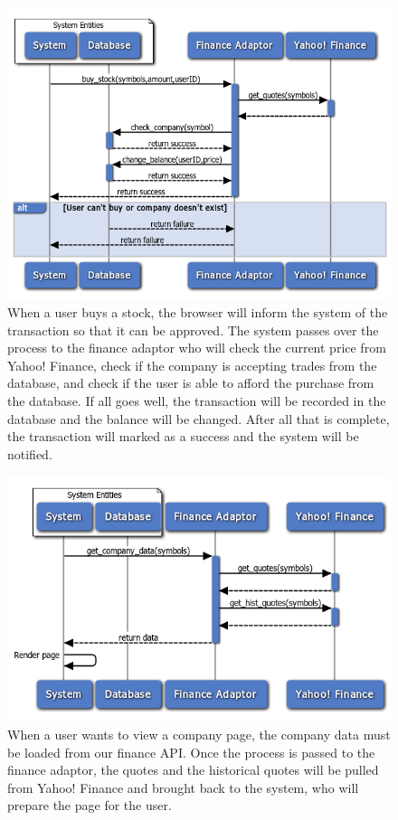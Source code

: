 \begin{figure}
\centering
\includegraphics[width=5.5in]{./Diagrams/InteractionDiagrams/buyingstock.png}
\caption{When a user buys a stock, the browser will inform the system of the transaction so that it can be approved. The system passes over the process to the finance adaptor who will check the current price from Yahoo! Finance, check if the company is accepting trades from the database, and check if the user is able to afford the purchase from the database. If all goes well, the transaction will be recorded in the database and the balance will be changed. After all that is complete, the transaction will marked as a success and the system will be notified.}
\end{figure}

\begin{figure}
\centering
\includegraphics[width=5.5in]{./Diagrams/InteractionDiagrams/rendercompanypage.png}
\caption{When a user wants to view a company page, the company data must be loaded from our finance API. Once the process is passed to the finance adaptor, the quotes and the historical quotes will be pulled from Yahoo! Finance and brought back to the system, who will prepare the page for the user.}
\end{figure}

